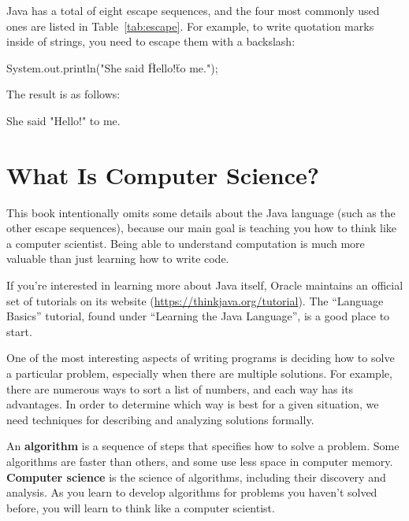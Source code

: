 Java has a total of eight escape sequences, and the four most commonly used ones are listed in Table~\ref{tab:escape}.
For example, to write quotation marks inside of strings, you need to escape them with a backslash:

\begin{code}
System.out.println("She said \"Hello!\" to me.");
\end{code}

The result is as follows:

\begin{stdout}
She said "Hello!" to me.
\end{stdout}


\section{What Is Computer Science?}

This book intentionally omits some details about the Java language (such as the other escape sequences), because our main goal is teaching you how to think like a computer scientist.
Being able to understand computation is much more valuable than just learning how to write code.

If you're interested in learning more about Java itself, Oracle maintains an official set of tutorials on its website (\url{https://thinkjava.org/tutorial}).
The ``Language Basics'' tutorial, found under ``Learning the Java Language'', is a good place to start.

One of the most interesting aspects of writing programs is deciding how to solve a particular problem, especially when there are multiple solutions.
For example, there are numerous ways to sort a list of numbers, and each way has its advantages.
In order to determine which way is best for a given situation, we need techniques for describing and analyzing solutions formally.


An {\bf algorithm} is a sequence of steps that specifies how to solve a problem.
Some algorithms are faster than others, and some use less space in computer memory.
{\bf Computer science} is the science of algorithms, including their discovery and analysis.
As you learn to develop algorithms for problems you haven't solved before, you will learn to think like a computer scientist.

